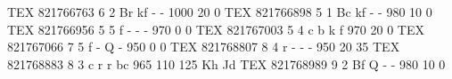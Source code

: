 TEX       821766763  6  2 Br  kf    -     -         1000   20    0 
TEX       821766898  5  1 Bc  kf    -     -          980   10    0 
TEX       821766956  5  5 f   -     -     -          970    0    0 
TEX       821767003  5  4 c   b     k     f          970   20    0 
TEX       821767066  7  5 f   -     Q     -          950    0    0 
TEX       821768807  8  4 r   -     -     -          950   20   35 
TEX       821768883  8  3 c   r     r     bc         965  110  125 Kh Jd
TEX       821768989  9  2 Bf  Q     -     -          980   10    0 

